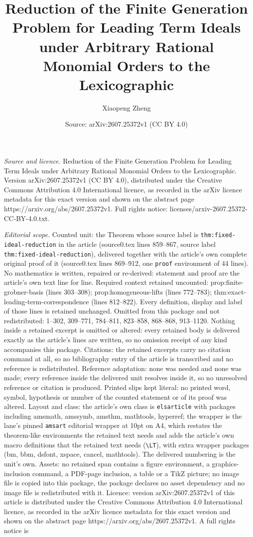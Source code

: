 \documentclass[10pt,a4paper]{amsart}
\title[Reduction of the Finite Generation Problem for Leading Term ]{Reduction of the Finite Generation Problem for Leading Term Ideals under Arbitrary Rational Monomial Orders to the Lexicographic}
\author{Xiaopeng Zheng}
\date{Source: arXiv:2607.25372v1 (CC BY 4.0)}
\begin{document}
\maketitle

\noindent\emph{Source and licence.} Reduction of the Finite Generation Problem for Leading Term Ideals under Arbitrary Rational Monomial Orders to the Lexicographic. Version arXiv:2607.25372v1 (CC BY 4.0), distributed under the Creative Commons Attribution 4.0 International licence, as recorded in the arXiv licence metadata for this exact version and shown on the abstract page https://arxiv.org/abs/2607.25372v1. Full rights notice: licenses/arxiv-2607.25372-CC-BY-4.0.txt.\par\smallskip

\noindent\textit{Editorial scope.} Counted unit: the Theorem whose source label is \texttt{thm:fixed-ideal-reduction} in the article (source0.tex lines 859--867, source label \texttt{thm:fixed-ideal-reduction}), delivered together with the article's own complete original proof of it (source0.tex lines 869--912, one \texttt{proof} environment of 44 lines). No mathematics is written, repaired or re-derived: statement and proof are the article's own text line for line. Required context retained uncounted: prop:finite-grobner-basis (lines 303--308); prop:homogeneous-lifts (lines 772--783); thm:exact-leading-term-correspondence (lines 812--822). Every definition, display and label of those lines is retained unchanged. Omitted from this package and not redistributed: 1--302, 309--771, 784--811, 823--858, 868--868, 913--1120. Nothing inside a retained excerpt is omitted or altered: every retained body is delivered exactly as the article's lines are written, so no omission receipt of any kind accompanies this package. Citations: the retained excerpts carry no citation command at all, so no bibliography entry of the article is transcribed and no reference is redistributed. Reference adaptation: none was needed and none was made; every reference inside the delivered unit resolves inside it, so no unresolved reference or citation is produced. Printed slips kept literal: no printed word, symbol, hypothesis or number of the counted statement or of its proof was altered. Layout and class: the article's own class is \texttt{elsarticle} with packages including amsmath, amssymb, amsthm, mathtools, hyperref; the wrapper is the lane's pinned \texttt{amsart} editorial wrapper at 10pt on A4, which restates the theorem-like environments the retained text needs and adds the article's own macro definitions that the retained text needs (\texttt{\textbackslash LT}), with extra wrapper packages (bm, bbm, dsfont, xspace, cancel, mathtools). The delivered numbering is the unit's own. Assets: no retained span contains a figure environment, a graphics-inclusion command, a PDF-page inclusion, a table or a TikZ picture; no image file is copied into this package, the package declares no asset dependency and no image file is redistributed with it. Licence: version arXiv:2607.25372v1 of this article is distributed under the Creative Commons Attribution 4.0 International licence, as recorded in the arXiv licence metadata for this exact version and shown on the abstract page https://arxiv.org/abs/2607.25372v1. A full rights notice is 
\end{document}
